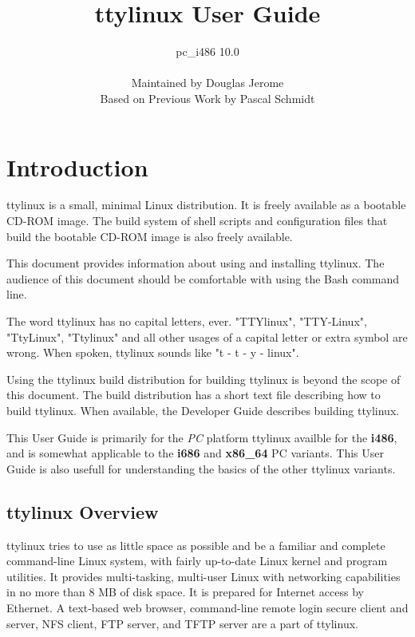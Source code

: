 \documentclass[10pt]{article}
\title{ttylinux User Guide}
\author{pc\_i486 10.0\\ \\Maintained by Douglas Jerome\\Based on Previous Work by Pascal Schmidt}
\begin{document}
\maketitle
\thispagestyle{empty}
\newpage


\tableofcontents


\newpage
{}
\parskip=10pt
\section{Introduction}

ttylinux is a small, minimal Linux distribution. It is freely available as a
bootable CD-ROM image. The build system of shell scripts and configuration
files that build the bootable CD-ROM image is also freely available.

This document provides information about using and installing ttylinux. The
audience of this document should be comfortable with using the Bash command
line.

The word ttylinux has no capital letters, ever. "TTYlinux", "TTY-Linux",
"TtyLinux", "Ttylinux" and all other usages of a capital letter or extra symbol
are wrong. When spoken, ttylinux sounds like "t - t - y - linux".

Using the ttylinux build distribution for building ttylinux is beyond the scope
of this document. The build distribution has a short text file describing how
to build ttylinux. When available, the Developer Guide describes building
ttylinux.

This User Guide is primarily for the {\it PC} platform ttylinux availble for
the {\bf i486}, and is somewhat applicable to the {\bf i686} and {\bf x86\_64}
PC variants. This User Guide is also usefull for understanding the basics of
the other ttylinux variants.

\subsection{ttylinux Overview}

ttylinux tries to use as little space as possible and be a familiar and
complete command-line Linux system, with fairly up-to-date Linux kernel and
program utilities. It provides multi-tasking, multi-user Linux with networking
capabilities in no more than 8 MB of disk space. It is prepared for Internet
access by Ethernet. A text-based web browser, command-line remote login secure
client and server, NFS client, FTP server, and TFTP server are a part of
ttylinux.
\end{document}
